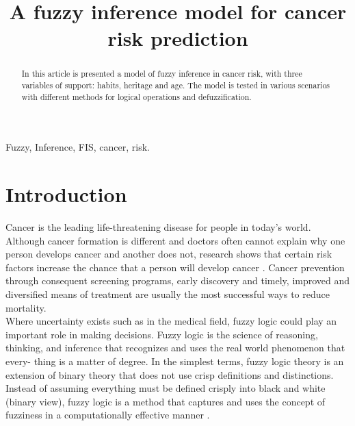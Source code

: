 \documentclass[conference]{IEEEtran}
\begin{document}
\title{A fuzzy inference model for cancer risk prediction\\
}

\author{
}

\maketitle

\begin{abstract}
In this article is presented a model of fuzzy inference in cancer risk, with three variables of support: habits, heritage and age. The model is tested in various scenarios with different methods for logical operations and defuzzification.
\end{abstract}

\begin{IEEEkeywords}
Fuzzy, Inference, FIS, cancer, risk.
\end{IEEEkeywords}

\section{Introduction}
Cancer is the leading life-threatening disease for people in today’s world. Although cancer formation is different and doctors often cannot explain why one person develops cancer and another does not, research shows that certain risk factors increase the chance that a person will develop cancer \cite{COGGON20051434}. Cancer prevention through consequent screening programs, early discovery and timely, improved and diversified means of treatment are usually the most successful ways to reduce mortality. \\

Where uncertainty exists such as in the medical
field, fuzzy logic could play an important role in making decisions. Fuzzy logic is the science of reasoning, thinking, and inference that recognizes and uses the real world phenomenon that every- thing is a matter of degree. In the simplest terms, fuzzy logic theory is an extension of binary theory that does not use crisp definitions and distinctions.
Instead of assuming everything must be
defined crisply into black and white (binary view), fuzzy logic is a method that captures and uses the concept of fuzziness in a computationally effective manner \cite{Zadeh1996}. \\
\end{document}
